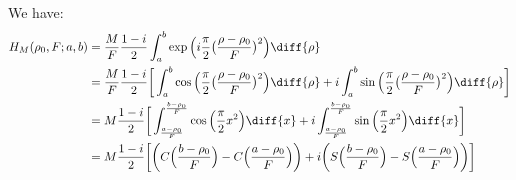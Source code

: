 \documentclass[crop=false,class=book,oneside]{standalone}
\begin{document}
            We have:
            \begin{align*}
                H_{M}(\rho_0,F;a,b)
                &=\frac{M}{F}\frac{1-i}{2}
                    \int_{a}^{b}
                    \exp\Big(i\frac{\pi}{2}
                    \big(\frac{\rho-\rho_0}{F}\big)^{2}\Big)
                \diff{\rho}\\
                &=\frac{M}{F}\frac{1-i}{2}
                    \bigg[\int_{a}^{b}
                    \cos\Big(\frac{\pi}{2}
                    \big(\frac{\rho-\rho_0}{F}\big)^{2}\Big)
                \diff{\rho}+
                i\int_{a}^{b}
                    \sin\Big(\frac{\pi}{2}
                    \big(\frac{\rho-\rho_0}{F}\big)^{2}\Big)
                    \diff{\rho}\bigg]\\
                &=M\frac{1-i}{2}\bigg[
                    \int_{\frac{a-\rho_0}{F}}^{\frac{b-\rho_0}{F}}
                    \cos\Big(\frac{\pi}{2}x^{2}\Big)\diff{x}+
                i\int_{\frac{a-\rho_0}{F}}^{\frac{b-\rho_0}{F}}
                    \sin\Big(\frac{\pi}{2}x^{2}\Big)\diff{x}
                \bigg]\\
                &=M\frac{1-i}{2}
                    \bigg[\bigg(C\Big(\frac{b-\rho_{0}}{F}\Big)-
                        C\Big(\frac{a-\rho_0}{F}\Big)\bigg)
                    +i\bigg(S\Big(\frac{b-\rho_0}{F}\Big)-
                        S\Big(\frac{a-\rho_0}{F}\Big)\bigg)\bigg]
            \end{align*}
\end{document}
